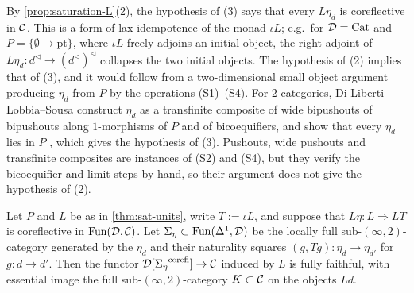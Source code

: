 \begin{rmk}
\label{rmk:sat-units-kz}
%
By \cref{prop:saturation-L}(2), the hypothesis of (3) says that every
$L\eta_{d}$ is coreflective in $\mathcal{C}$. This is a form of lax idempotence of the
monad $\iota L$; e.g.\ for $\mathcal{D} = \mathrm{Cat}$ and
$P = \{\emptyset \to \mathrm{pt}\}$,
where $\iota L$ freely adjoins an initial object, the right adjoint of
$L\eta_{d}\colon d^{\triangleleft} \to (d^{\triangleleft})^{\triangleleft}$
collapses the two initial objects.
The hypothesis of (2) implies that of (3),
and it would follow from a two-dimensional small object argument producing
$\eta_{d}$ from $P$ by the operations (S1)--(S4).
For $2$-categories, Di Liberti--Lobbia--Sousa
\cite[Thm.~4.3]{dilibertilobbiasousa2022kz} construct $\eta_{d}$ as a
transfinite composite of wide bipushouts of bipushouts along $1$-morphisms of
$P$ and of bicoequifiers, and show that every $\eta_{d}$ lies in $\overline{P}$
\cite[Lemma~3.5]{dilibertilobbiasousa2022kz}, which gives the hypothesis of (3).
Pushouts, wide pushouts and transfinite composites are instances of (S2) and
(S4), but they verify the bicoequifier and limit steps by hand,
so their argument does not give the hypothesis of (2).
\end{rmk}

\begin{conj}
\label{conj:kleisli}
%
Let $P$ and $L$ be as in \cref{thm:sat-units}, write $T := \iota L$,
and suppose that
$L\eta\colon L \Rightarrow LT$
is coreflective in $\operatorname{Fun}(\mathcal{D},\mathcal{C})$. Let
$\Sigma_{\eta} \subset \operatorname{Fun}(\Delta^{1},\mathcal{D})$
be the locally full sub-$(\infty,2)$-category generated by the $\eta_{d}$ and
their naturality squares
$(g,Tg)\colon \eta_{d} \to \eta_{d'}$
for $g\colon d \to d'$. Then the functor
$\mathcal{D}[{\Sigma_{\eta}}^{\mathrm{corefl}}] \to \mathcal{C}$
induced by $L$ is fully faithful, with essential image the full
sub-$(\infty,2)$-category $K \subset \mathcal{C}$ on the objects $Ld$.
\end{conj}

